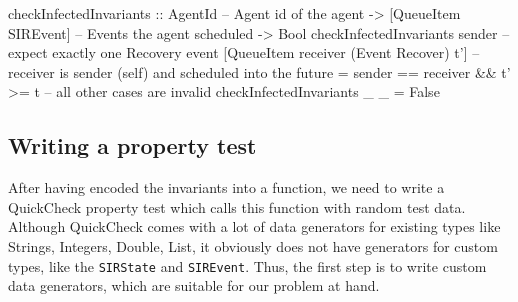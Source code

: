 \begin{HaskellCode}
checkInfectedInvariants :: AgentId               -- Agent id of the agent 
                        -> [QueueItem SIREvent]  -- Events the agent scheduled
                        -> Bool
checkInfectedInvariants sender 
  -- expect exactly one Recovery event
  [QueueItem receiver (Event Recover) t'] 
  -- receiver is sender (self) and scheduled into the future
  = sender == receiver && t' >= t 
-- all other cases are invalid
checkInfectedInvariants _ _ = False
\end{HaskellCode}

%
%

\subsection{Writing a property test}
After having encoded the invariants into a function, we need to write a QuickCheck property test which calls this function with random test data. Although QuickCheck comes with a lot of data generators for existing types like Strings, Integers, Double, List, it obviously does not have generators for custom types, like the \texttt{SIRState} and \texttt{SIREvent}. Thus, the first step is to write custom data generators, which are suitable for our problem at hand.

